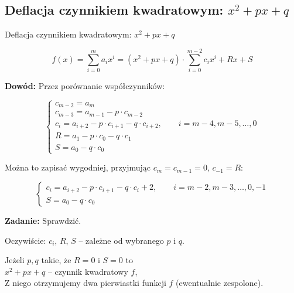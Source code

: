 \subsection{Deflacja czynnikiem kwadratowym: $ x^2 +px + q $}

\begin{frame}{Deflacja czynnikiem kwadratowym: $ x^2 +px + q $}
  \begin{block}{}
    $$ f(x) = \sum_{i=0}^m a_i x^i = (x^2 + px + q) \cdot \sum_{i=0}^{m-2} c_i x^i + Rx +S $$
  \end{block}

  \vspace{6mm}

  \textbf{Dowód: } Przez porównanie współczynników:

  $$ \left \{ \begin{array}{l}
  c_{m-2} = a_m \\
  c_{m-3} = a_{m-1} - p \cdot c_{m-2} \\
  c_i = a_{i+2} - p \cdot c_{i+1} - q \cdot c_{i + 2}, \qquad i = m - 4, m - 5, \dots , 0 \\
  R = a_1 - p \cdot c_0 - q \cdot c_1 \\
  S = a_0 - q \cdot c_0
  \end{array} \right. $$
\end{frame}

\begin{frame}
  Można to zapisać wygodniej, przyjmując $ c_m = c_{m-1} = 0 $, $ c_{-1} = R $:

  \begin{block}{}
    $$ \left \{ \begin{array}{l}
    c_i = a_{i+2} - p \cdot c_{i+1} - q \cdot c_i + 2, \qquad i = m-2, m-3, \dots , 0, -1 \\
    S = a_0 - q \cdot c_0
    \end{array} \right. $$
  \end{block}

  \textbf{Zadanie:} Sprawdzić.

  \vspace{5px}

  Oczywiście: $c_i$, $R$, $S$ -- zależne od wybranego $p$ i $q$.

  \vspace{5px}

  Jeżeli $p,q$ takie, że $R = 0$ i $S = 0$ to \\ $x^2 + px + q$ -- czynnik kwadratowy $f$, \\Z niego otrzymujemy dwa pierwiastki funkcji $f$ (ewentualnie zespolone).
\end{frame}
